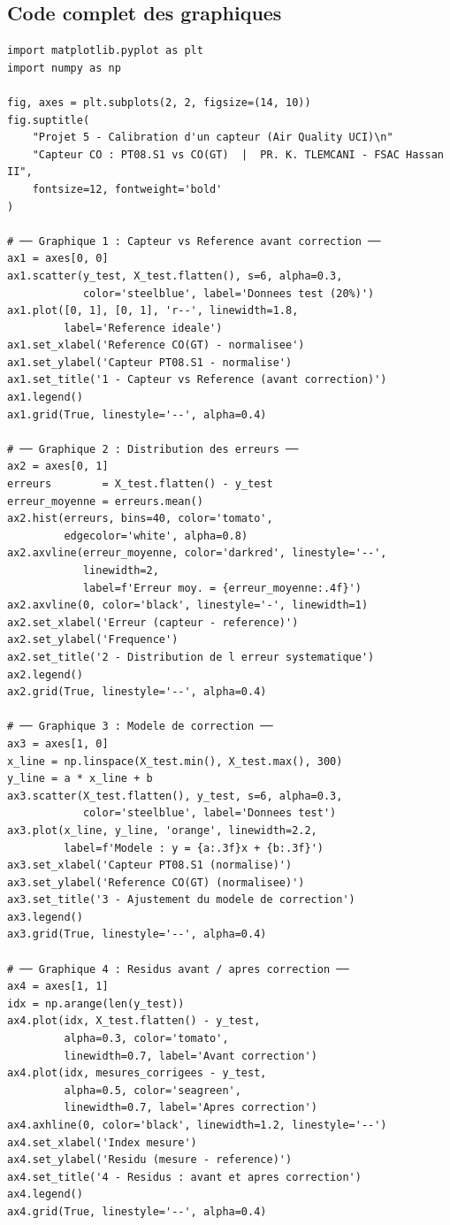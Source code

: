 \documentclass[12pt, a4paper]{article}
\begin{document}
\subsection{Code complet des graphiques}

\begin{lstlisting}[style=python, caption=Génération des 4 graphiques de calibration]
import matplotlib.pyplot as plt
import numpy as np

fig, axes = plt.subplots(2, 2, figsize=(14, 10))
fig.suptitle(
    "Projet 5 - Calibration d'un capteur (Air Quality UCI)\n"
    "Capteur CO : PT08.S1 vs CO(GT)  |  PR. K. TLEMCANI - FSAC Hassan II",
    fontsize=12, fontweight='bold'
)

# ── Graphique 1 : Capteur vs Reference avant correction ──
ax1 = axes[0, 0]
ax1.scatter(y_test, X_test.flatten(), s=6, alpha=0.3,
            color='steelblue', label='Donnees test (20%)')
ax1.plot([0, 1], [0, 1], 'r--', linewidth=1.8,
         label='Reference ideale')
ax1.set_xlabel('Reference CO(GT) - normalisee')
ax1.set_ylabel('Capteur PT08.S1 - normalise')
ax1.set_title('1 - Capteur vs Reference (avant correction)')
ax1.legend()
ax1.grid(True, linestyle='--', alpha=0.4)

# ── Graphique 2 : Distribution des erreurs ──
ax2 = axes[0, 1]
erreurs        = X_test.flatten() - y_test
erreur_moyenne = erreurs.mean()
ax2.hist(erreurs, bins=40, color='tomato',
         edgecolor='white', alpha=0.8)
ax2.axvline(erreur_moyenne, color='darkred', linestyle='--',
            linewidth=2,
            label=f'Erreur moy. = {erreur_moyenne:.4f}')
ax2.axvline(0, color='black', linestyle='-', linewidth=1)
ax2.set_xlabel('Erreur (capteur - reference)')
ax2.set_ylabel('Frequence')
ax2.set_title('2 - Distribution de l erreur systematique')
ax2.legend()
ax2.grid(True, linestyle='--', alpha=0.4)

# ── Graphique 3 : Modele de correction ──
ax3 = axes[1, 0]
x_line = np.linspace(X_test.min(), X_test.max(), 300)
y_line = a * x_line + b
ax3.scatter(X_test.flatten(), y_test, s=6, alpha=0.3,
            color='steelblue', label='Donnees test')
ax3.plot(x_line, y_line, 'orange', linewidth=2.2,
         label=f'Modele : y = {a:.3f}x + {b:.3f}')
ax3.set_xlabel('Capteur PT08.S1 (normalise)')
ax3.set_ylabel('Reference CO(GT) (normalisee)')
ax3.set_title('3 - Ajustement du modele de correction')
ax3.legend()
ax3.grid(True, linestyle='--', alpha=0.4)

# ── Graphique 4 : Residus avant / apres correction ──
ax4 = axes[1, 1]
idx = np.arange(len(y_test))
ax4.plot(idx, X_test.flatten() - y_test,
         alpha=0.3, color='tomato',
         linewidth=0.7, label='Avant correction')
ax4.plot(idx, mesures_corrigees - y_test,
         alpha=0.5, color='seagreen',
         linewidth=0.7, label='Apres correction')
ax4.axhline(0, color='black', linewidth=1.2, linestyle='--')
ax4.set_xlabel('Index mesure')
ax4.set_ylabel('Residu (mesure - reference)')
ax4.set_title('4 - Residus : avant et apres correction')
ax4.legend()
ax4.grid(True, linestyle='--', alpha=0.4)


\end{lstlisting}
\end{document}
